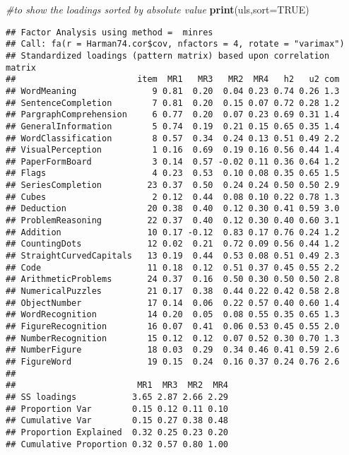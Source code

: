 \documentclass[]{book}
\newenvironment{Shaded}{\begin{snugshade}}{\end{snugshade}}
\newcommand{\KeywordTok}[1]{\textcolor[rgb]{0.13,0.29,0.53}{\textbf{{#1}}}}
\newcommand{\DataTypeTok}[1]{\textcolor[rgb]{0.13,0.29,0.53}{{#1}}}
\newcommand{\CommentTok}[1]{\textcolor[rgb]{0.56,0.35,0.01}{\textit{{#1}}}}
\newcommand{\OtherTok}[1]{\textcolor[rgb]{0.56,0.35,0.01}{{#1}}}
\newcommand{\NormalTok}[1]{{#1}}
\begin{document}
\begin{Shaded}
\begin{Highlighting}[]
\CommentTok{#to show the loadings sorted by absolute value}
\KeywordTok{print}\NormalTok{(uls,}\DataTypeTok{sort=}\OtherTok{TRUE}\NormalTok{)}
\end{Highlighting}
\end{Shaded}

\begin{verbatim}
## Factor Analysis using method =  minres
## Call: fa(r = Harman74.cor$cov, nfactors = 4, rotate = "varimax")
## Standardized loadings (pattern matrix) based upon correlation matrix
##                        item  MR1   MR3   MR2  MR4   h2   u2 com
## WordMeaning               9 0.81  0.20  0.04 0.23 0.74 0.26 1.3
## SentenceCompletion        7 0.81  0.20  0.15 0.07 0.72 0.28 1.2
## PargraphComprehension     6 0.77  0.20  0.07 0.23 0.69 0.31 1.4
## GeneralInformation        5 0.74  0.19  0.21 0.15 0.65 0.35 1.4
## WordClassification        8 0.57  0.34  0.24 0.13 0.51 0.49 2.2
## VisualPerception          1 0.16  0.69  0.19 0.16 0.56 0.44 1.4
## PaperFormBoard            3 0.14  0.57 -0.02 0.11 0.36 0.64 1.2
## Flags                     4 0.23  0.53  0.10 0.08 0.35 0.65 1.5
## SeriesCompletion         23 0.37  0.50  0.24 0.24 0.50 0.50 2.9
## Cubes                     2 0.12  0.44  0.08 0.10 0.22 0.78 1.3
## Deduction                20 0.38  0.40  0.12 0.30 0.41 0.59 3.0
## ProblemReasoning         22 0.37  0.40  0.12 0.30 0.40 0.60 3.1
## Addition                 10 0.17 -0.12  0.83 0.17 0.76 0.24 1.2
## CountingDots             12 0.02  0.21  0.72 0.09 0.56 0.44 1.2
## StraightCurvedCapitals   13 0.19  0.44  0.53 0.08 0.51 0.49 2.3
## Code                     11 0.18  0.12  0.51 0.37 0.45 0.55 2.2
## ArithmeticProblems       24 0.37  0.16  0.50 0.30 0.50 0.50 2.8
## NumericalPuzzles         21 0.17  0.38  0.44 0.22 0.42 0.58 2.8
## ObjectNumber             17 0.14  0.06  0.22 0.57 0.40 0.60 1.4
## WordRecognition          14 0.20  0.05  0.08 0.55 0.35 0.65 1.3
## FigureRecognition        16 0.07  0.41  0.06 0.53 0.45 0.55 2.0
## NumberRecognition        15 0.12  0.12  0.07 0.52 0.30 0.70 1.3
## NumberFigure             18 0.03  0.29  0.34 0.46 0.41 0.59 2.6
## FigureWord               19 0.15  0.24  0.16 0.37 0.24 0.76 2.6
## 
##                        MR1  MR3  MR2  MR4
## SS loadings           3.65 2.87 2.66 2.29
## Proportion Var        0.15 0.12 0.11 0.10
## Cumulative Var        0.15 0.27 0.38 0.48
## Proportion Explained  0.32 0.25 0.23 0.20
## Cumulative Proportion 0.32 0.57 0.80 1.00

\end{verbatim}
\end{document}

